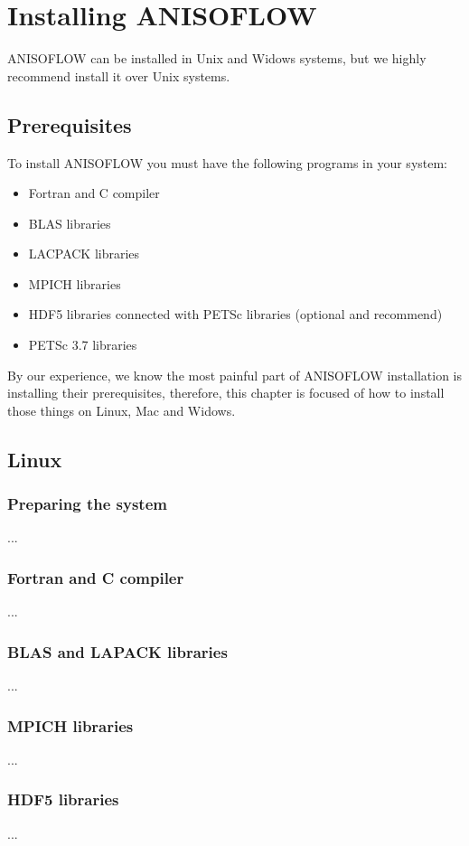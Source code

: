 \chapter{Installing ANISOFLOW}

ANISOFLOW can be installed in Unix and Widows systems, but we highly recommend install it over Unix systems.

\section{Prerequisites}
To install ANISOFLOW you must have the following programs in your system:
\begin{itemize}
\item Fortran and C compiler
\item BLAS libraries
\item LACPACK libraries
\item MPICH libraries
\item HDF5 libraries connected with PETSc libraries (optional and recommend)
\item PETSc 3.7 libraries
\end{itemize}

By our experience, we know the most painful part of ANISOFLOW installation is installing their prerequisites, therefore, this chapter is focused of how to install those things on Linux, Mac and Widows. 

\section{Linux}
\subsection{Preparing the system}
...
\subsection{Fortran and C compiler}
...
\subsection{BLAS and LAPACK libraries}
...
\subsection{MPICH libraries}
...
\subsection{HDF5 libraries}
...
